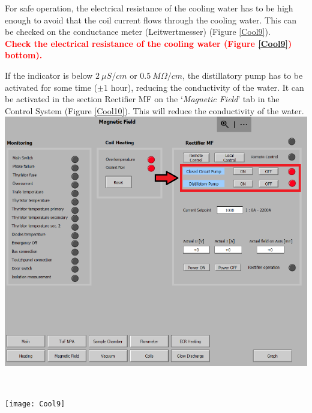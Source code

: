 \documentclass[fleqn,a4paper,20pt]{article}
\begin{document}
\newpage

For safe operation, the electrical resistance of the cooling water has to be high enough to avoid that the coil current flows through the cooling water. This can be checked on the conductance meter (Leitwertmesser) (Figure \ref{Cool9}).\\

\textcolor{red}{\textbf{Check the electrical resistance of the cooling water (Figure \ref{Cool9}) bottom).}}\\

\begin{minipage}{.58\textwidth}

If the indicator is below $ 2\ \mu S/cm$ or $0.5\ M\Omega /cm$, the distillatory pump has to be activated for some time ($\pm 1$ hour), reducing the conductivity of the water. It can be activated in the section Rectifier MF on the `\textit{Magnetic Field}' tab in the Control System (Figure \ref{Cool10}). This will reduce the conductivity of the water. \\

	\includegraphics[width=\linewidth]{Cool10}
	\label{Cool10}
\end{minipage}
\begin{minipage}{.02\textwidth}
	$\ $\\
\end{minipage}
\begin{minipage}{.4\textwidth}


	\texttt{[image: Cool9]}
	\captionsetup{width=0.75\textwidth}
	\label{Cool9}
\end{minipage}
\vspace*{0.5cm}
\end{document}
